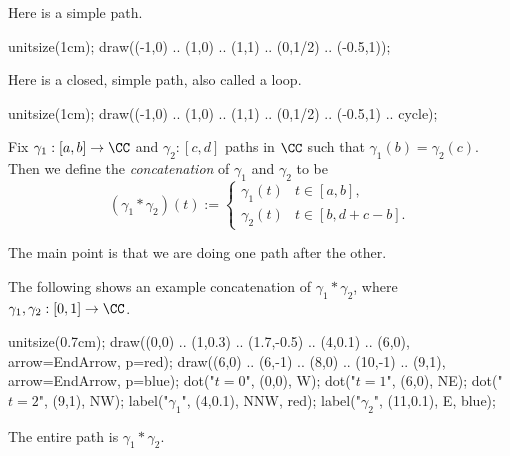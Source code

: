\begin{example}
	Here is a simple path.
	\begin{center}
		\begin{asy}
			unitsize(1cm);
			draw((-1,0) .. (1,0) .. (1,1) .. (0,1/2) .. (-0.5,1));
		\end{asy}
	\end{center}
\end{example}
\begin{example}
	Here is a closed, simple path, also called a loop.
	\begin{center}
		\begin{asy}
			unitsize(1cm);
			draw((-1,0) .. (1,0) .. (1,1) .. (0,1/2) .. (-0.5,1) .. cycle);
		\end{asy}
	\end{center}
\end{example}
\begin{definition}[Concatenation]
	Fix $\gamma_1:[a,b]\to\CC$ and $\gamma_2:[c,d]$ paths in $\CC$ such that $\gamma_1(b)=\gamma_2(c)$. Then we define the \textit{concatenation} of $\gamma_1$ and $\gamma_2$ to be
	\[(\gamma_1*\gamma_2)(t):=\begin{cases}
		\gamma_1(t) & t\in[a,b], \\
		\gamma_2(t) & t\in[b,d+c-b].
	\end{cases}\]
\end{definition}
The main point is that we are doing one path after the other.
\begin{example}
	The following shows an example concatenation of $\gamma_1*\gamma_2$, where $\gamma_1,\gamma_2:[0,1]\to\CC$.
	\begin{center}
		\begin{asy}
			unitsize(0.7cm);
			draw((0,0) .. (1,0.3) .. (1.7,-0.5) .. (4,0.1) .. (6,0), arrow=EndArrow, p=red);
			draw((6,0) .. (6,-1) .. (8,0) .. (10,-1) .. (9,1), arrow=EndArrow, p=blue);
			dot("$t=0$", (0,0), W);
			dot("$t=1$", (6,0), NE);
			dot("$t=2$", (9,1), NW);
			label("$\gamma_1$", (4,0.1), NNW, red);
			label("$\gamma_2$", (11,0.1), E, blue);
		\end{asy}
	\end{center}
	The entire path is $\gamma_1*\gamma_2$.
\end{example}

